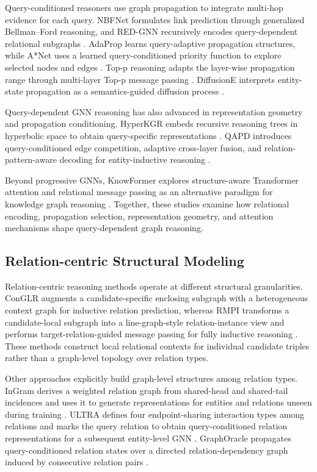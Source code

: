 \documentclass[a4paper,fleqn]{cas-dc}
\begin{document}
Query-conditioned reasoners use graph propagation to integrate multi-hop evidence for each query. NBFNet formulates link prediction through generalized Bellman--Ford reasoning, and RED-GNN recursively encodes query-dependent relational subgraphs \citep{Zhu2021NBFNet,Zhang2022REDGNN}. AdaProp learns query-adaptive propagation structures, while A*Net uses a learned query-conditioned priority function to explore selected nodes and edges \citep{Zhang2023AdaProp,Zhu2023AStarNet}. Top-p reasoning adapts the layer-wise propagation range through multi-layer Top-p message passing \citep{Liu2025TopPReasoning}. DiffusionE interprets entity-state propagation as a semantics-guided diffusion process \citep{Cao2024DiffusionE}.

Query-dependent GNN reasoning has also advanced in representation geometry and propagation conditioning. HyperKGR embeds recursive reasoning trees in hyperbolic space to obtain query-specific representations \citep{HyperKGR2025}. QAPD introduces query-conditioned edge competition, adaptive cross-layer fusion, and relation-pattern-aware decoding for entity-inductive reasoning \citep{QAPD2026}.

Beyond progressive GNNs, KnowFormer explores structure-aware Transformer attention and relational message passing as an alternative paradigm for knowledge graph reasoning \citep{Liu2024KnowFormer}. Together, these studies examine how relational encoding, propagation selection, representation geometry, and attention mechanisms shape query-dependent graph reasoning.

\subsection{Relation-centric Structural Modeling}\label{subsec:relation-centric-modeling}

Relation-centric reasoning methods operate at different structural granularities. ConGLR augments a candidate-specific enclosing subgraph with a heterogeneous context graph for inductive relation prediction, whereas RMPI transforms a candidate-local subgraph into a line-graph-style relation-instance view and performs target-relation-guided message passing for fully inductive reasoning \citep{Lin2022ConGLR,Geng2023RMPI}. These methods construct local relational contexts for individual candidate triples rather than a graph-level topology over relation types.

Other approaches explicitly build graph-level structures among relation types. InGram derives a weighted relation graph from shared-head and shared-tail incidences and uses it to generate representations for entities and relations unseen during training \citep{Lee2023InGram}. ULTRA defines four endpoint-sharing interaction types among relations and marks the query relation to obtain query-conditioned relation representations for a subsequent entity-level GNN \citep{Galkin2024ULTRA}. GraphOracle propagates query-conditioned relation states over a directed relation-dependency graph induced by consecutive relation pairs \citep{Du2026GraphOracle}.
\end{document}
